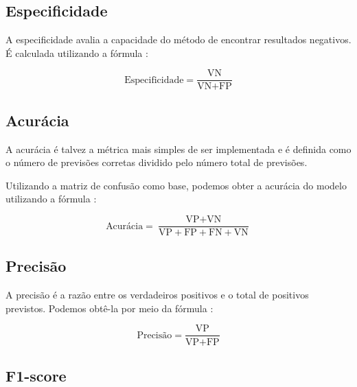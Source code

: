 \subsection{Especificidade}

A especificidade avalia a capacidade do método de encontrar resultados negativos. É calculada utilizando a fórmula \cite{Métricas}:

\begin{center}
\begin{equation}
\text{Especificidade} = \dfrac{\text{VN}}{\text{VN} + \text{FP}}
\end{equation}
\end{center}

\subsection{Acurácia}

A acurácia é talvez a métrica mais simples de ser implementada e é definida como o número de previsões corretas dividido pelo número total de previsões.

Utilizando a matriz de confusão como base, podemos obter a acurácia do modelo utilizando a fórmula \cite{Métricas}:

\begin{center}
\begin{equation}
\text{Acurácia} = \dfrac{\text{VP} + \text{VN}}{\text{VP} + \text{FP} + \text{FN} + \text{VN}}
\end{equation}
\end{center}

\subsection{Precisão}

A precisão é a razão entre os verdadeiros positivos e o total de positivos previstos. Podemos obtê-la por meio da fórmula \cite{Métricas}:

\begin{center}
\begin{equation}
\text{Precisão} = \dfrac{\text{VP}}{\text{VP} + \text{FP}}
\end{equation}
\end{center}

\subsection{F1-score}

